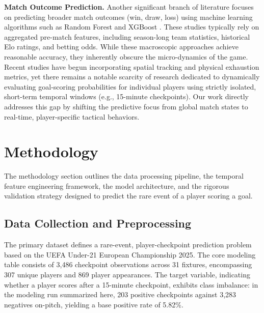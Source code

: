 \documentclass[11pt, a4paper]{article}
\begin{document}
\textbf{Match Outcome Prediction.} Another significant branch of literature focuses on predicting broader match outcomes (win, draw, loss) using machine learning algorithms such as Random Forest \cite{breiman2001random} and XGBoost \cite{chen2016xgboost}. These studies typically rely on aggregated pre-match features, including season-long team statistics, historical Elo ratings, and betting odds. While these macroscopic approaches achieve reasonable accuracy, they inherently obscure the micro-dynamics of the game. Recent studies have begun incorporating spatial tracking and physical exhaustion metrics, yet there remains a notable scarcity of research dedicated to dynamically evaluating goal-scoring probabilities for individual players using strictly isolated, short-term temporal windows (e.g., 15-minute checkpoints). Our work directly addresses this gap by shifting the predictive focus from global match states to real-time, player-specific tactical behaviors.

\section{Methodology}

The methodology section outlines the data processing pipeline, the temporal feature engineering framework, the model architecture, and the rigorous validation strategy designed to predict the rare event of a player scoring a goal.

\subsection{Data Collection and Preprocessing}

The primary dataset defines a rare-event, player-checkpoint prediction problem based on the UEFA Under-21 European Championship 2025. The core modeling table consists of 3,486 checkpoint observations across 31 fixtures, encompassing 307 unique players and 869 player appearances. The target variable, indicating whether a player scores after a 15-minute checkpoint, exhibits class imbalance: in the modeling run summarized here, 203 positive checkpoints against 3,283 negatives on-pitch, yielding a base positive rate of 5.82\%.
\end{document}
